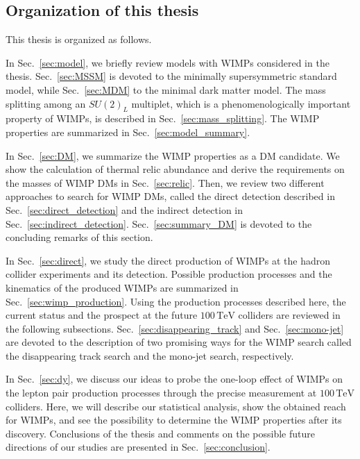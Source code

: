 \documentclass[12pt,twoside,book]{article}
\begin{document}
\clearpage


\subsection{Organization of this thesis}

This thesis is organized as follows.

In Sec.~\ref{sec:model}, we briefly review models with WIMPs considered in the thesis.
Sec.~\ref{sec:MSSM} is devoted to the minimally supersymmetric standard model, while Sec.~\ref{sec:MDM} to the minimal dark matter model.
The mass splitting among an $SU(2)_L$ multiplet, which is a phenomenologically important property of WIMPs, is described in Sec.~\ref{sec:mass_splitting}.
The WIMP properties are summarized in Sec.~\ref{sec:model_summary}.

In Sec.~\ref{sec:DM}, we summarize the WIMP properties as a DM candidate.
We show the calculation of thermal relic abundance and derive the requirements on the masses of WIMP DMs in Sec.~\ref{sec:relic}.
Then, we review two different approaches to search for WIMP DMs, called the direct detection described in Sec.~\ref{sec:direct_detection} and the indirect detection in Sec.~\ref{sec:indirect_detection}.
Sec.~\ref{sec:summary_DM} is devoted to the concluding remarks of this section.

In Sec.~\ref{sec:direct}, we study the direct production of WIMPs at the hadron collider experiments and its detection.
Possible production processes and the kinematics of the produced WIMPs are summarized in Sec.~\ref{sec:wimp_production}.
Using the production processes described here, the current status and the prospect at the future $100\,\mathrm{TeV}$ colliders are reviewed in the following subsections.
Sec.~\ref{sec:disappearing_track} and Sec.~\ref{sec:mono-jet} are devoted to the description of two promising ways for the WIMP search called the disappearing track search and the mono-jet search, respectively.

In Sec.~\ref{sec:dy}, we discuss our ideas to probe the one-loop effect of WIMPs on the lepton pair production processes through the precise measurement at $100\,\mathrm{TeV}$ colliders.
Here, we will describe our statistical analysis, show the obtained reach for WIMPs, and see the possibility to determine the WIMP properties after its discovery.
Conclusions of the thesis and comments on the possible future directions of our studies are presented in Sec.~\ref{sec:conclusion}.
\end{document}
